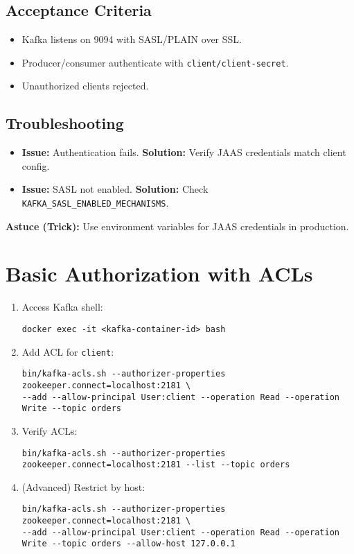\documentclass[12pt,a4paper]{report}
\begin{document}
\subsection{Acceptance Criteria}
\begin{itemize}
    \item Kafka listens on 9094 with SASL/PLAIN over SSL.
    \item Producer/consumer authenticate with \texttt{client/client-secret}.
    \item Unauthorized clients rejected.
\end{itemize}

\subsection{Troubleshooting}
\begin{itemize}
    \item \textbf{Issue:} Authentication fails.
      \textbf{Solution:} Verify JAAS credentials match client config.
    \item \textbf{Issue:} SASL not enabled.
      \textbf{Solution:} Check \texttt{KAFKA_SASL_ENABLED_MECHANISMS}.
\end{itemize}

\begin{framed}
\textbf{Astuce (Trick):} Use environment variables for JAAS credentials in production.
\end{framed}

\section{Basic Authorization with ACLs}
\begin{enumerate}
    \item Access Kafka shell:
    \begin{lstlisting}
docker exec -it <kafka-container-id> bash
    \end{lstlisting}
    \item Add ACL for \texttt{client}:
    \begin{lstlisting}
bin/kafka-acls.sh --authorizer-properties zookeeper.connect=localhost:2181 \
--add --allow-principal User:client --operation Read --operation Write --topic orders
    \end{lstlisting}
    \item Verify ACLs:
    \begin{lstlisting}
bin/kafka-acls.sh --authorizer-properties zookeeper.connect=localhost:2181 --list --topic orders
    \end{lstlisting}
    \item (Advanced) Restrict by host:
    \begin{lstlisting}
bin/kafka-acls.sh --authorizer-properties zookeeper.connect=localhost:2181 \
--add --allow-principal User:client --operation Read --operation Write --topic orders --allow-host 127.0.0.1
    \end{lstlisting}
\end{enumerate}
\end{document}
